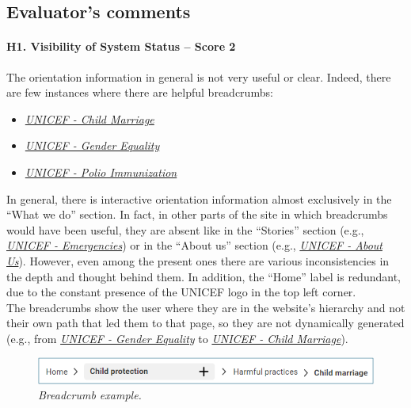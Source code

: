 \endgroup

\clearpage

\subsection*{Evaluator's comments}
\paragraph*{H1. Visibility of System Status – Score 2}
The orientation information in general is not very useful or clear. Indeed, there are few instances where there are helpful breadcrumbs:
\begin{itemize}
	\item \textit{\href{https://www.unicef.org/protection/child-marriage}{UNICEF - Child Marriage}}
	\item \textit{\href{https://www.unicef.org/gender-equality}{UNICEF - Gender Equality}}
	\item \textit{\href{https://www.unicef.org/immunization/polio}{UNICEF - Polio Immunization}}
\end{itemize}

In general, there is interactive orientation information almost exclusively in the “What we do” section. In fact, in other parts of the site in which breadcrumbs would have been useful, they are absent like in the “Stories” section (e.g., \textit{\href{https://www.unicef.org/emergencies/13-emergencies-need-more-attention-support-2024}{UNICEF - Emergencies}}) or in the “About us” section (e.g., \textit{\href{https://www.unicef.org/about-us/75-years-unicef}{UNICEF - About Us}}).
However, even among the present ones there are various inconsistencies in the depth and thought behind them. In addition, the “Home” label is redundant, due to the constant presence of the UNICEF logo in the top left corner.\\
The breadcrumbs show the user where they are in the website’s hierarchy and not their own path that led them to that page, so they are not dynamically generated (e.g., from \textit{\href{https://www.unicef.org/gender-equality}{UNICEF - Gender Equality}} to \textit{\href{https://www.unicef.org/protection/child-marriage}{UNICEF - Child Marriage}}).

\begin{figure}[h]
	\includegraphics[width=\textwidth]{Picture1.png}
	\captionsetup{font=small}
	\caption{\textit{Breadcrumb example.}}
	\label{fig:label1}
\end{figure}

